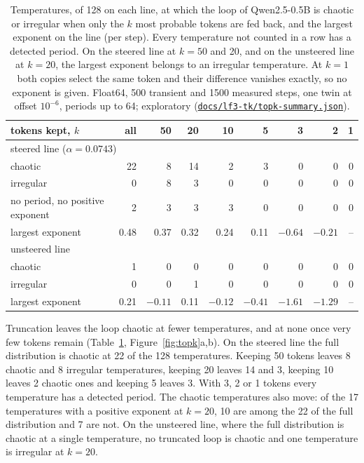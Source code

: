 \documentclass[11pt,letterpaper]{article}
\newcommand{\repourl}{https://github.com/tdj28/neural-shrimp}
\newcommand{\laterrepo}[1]{\href{\repourl/blob/0399fee2e9537a50993482aea8ec417e70286ac4/#1}{\nolinkurl{#1}}}
\begin{document}
\begin{table}[H]
\centering\small
\begin{tabular}{lrrrrrrrr}
\toprule
tokens kept, $k$ & all & 50 & 20 & 10 & 5 & 3 & 2 & 1 \\
\midrule
\multicolumn{9}{l}{steered line ($\alpha=0.0743$)} \\
chaotic & 22 & 8 & 14 & 2 & 3 & 0 & 0 & 0 \\
irregular & 0 & 8 & 3 & 0 & 0 & 0 & 0 & 0 \\
no period, no positive exponent & 2 & 3 & 3 & 3 & 0 & 0 & 0 & 0 \\
largest exponent & 0.48 & 0.37 & 0.32 & 0.24 & 0.11 & $-0.64$ & $-0.21$ & -- \\
\midrule
\multicolumn{9}{l}{unsteered line} \\
chaotic & 1 & 0 & 0 & 0 & 0 & 0 & 0 & 0 \\
irregular & 0 & 0 & 1 & 0 & 0 & 0 & 0 & 0 \\
largest exponent & 0.21 & $-0.11$ & 0.11 & $-0.12$ & $-0.41$ & $-1.61$ & $-1.29$ & -- \\
\bottomrule
\end{tabular}
\caption{Temperatures, of 128 on each line, at which the loop of Qwen2.5-0.5B is chaotic or irregular when only the
$k$ most probable tokens are fed back, and the largest exponent on the line (per step). Every temperature not counted
in a row has a detected period. On the steered line at $k=50$ and 20, and on the unsteered line at $k=20$, the largest
exponent belongs to an irregular temperature. At $k=1$ both copies select the same token and their difference
vanishes exactly, so no exponent is given. Float64, 500 transient and 1500 measured steps, one twin at offset
$10^{-6}$, periods up to 64; exploratory (\laterrepo{docs/lf3-tk/topk-summary.json}).}
\label{tab:topk}
\end{table}

Truncation leaves the loop chaotic at fewer temperatures, and at none once very few tokens remain
(Table~\ref{tab:topk}, Figure~\ref{fig:topk}a,b). On the steered line the full distribution is chaotic at 22 of the
128 temperatures. Keeping 50 tokens leaves 8 chaotic and 8 irregular temperatures, keeping 20 leaves 14 and 3, keeping
10 leaves 2 chaotic ones and keeping 5 leaves 3. With 3, 2 or 1 tokens every temperature has a detected period. The
chaotic temperatures also move: of the 17 temperatures with a positive exponent at $k=20$, 10 are among the 22 of the
full distribution and 7 are not. On the unsteered line, where the full distribution is chaotic at a single
temperature, no truncated loop is chaotic and one temperature is irregular at $k=20$.
\end{document}
